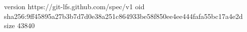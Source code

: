 version https://git-lfs.github.com/spec/v1
oid sha256:9ff45895a27b3b7d7d0e38a251c864933be58f850ee4ee444fafa55bc17a4e2d
size 43840

